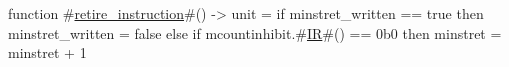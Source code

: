 function #\hyperref[sailRISCVzretirezyinstruction]{retire\_instruction}#() -> unit = {
  if   minstret_written == true
  then minstret_written = false
  else if mcountinhibit.#\hyperref[sailRISCVzIR]{IR}#() == 0b0
       then minstret = minstret + 1
}
